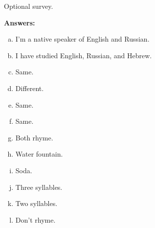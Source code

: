 \documentclass{../../templates/lkx_pset}
\begin{document}
\pagebreak
\begin{problem}{10}
  Optional survey.
\end{problem}
\begin{solution}
  \bfseries Answers:
  \begin{enumerate}[(a)]
    \item I'm a native speaker of English and Russian.
    \item I have studied English, Russian, and Hebrew.
    \item Same.
    \item Different.
    \item Same.
    \item Same.
    \item Both rhyme.
    \item Water fountain.
    \item Soda.
    \item Three syllables.
    \item Two syllables.
    \item Don't rhyme.
  \end{enumerate}
\end{solution}
\end{document}
